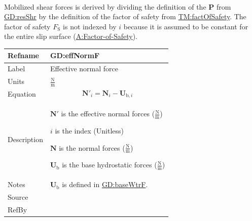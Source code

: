 \documentclass[12pt]{article}
\begin{document}
\paragraph{}
\label{GD:mobShrDeriv}
Mobilized shear forces is derived by dividing the definition of the $\symbf{P}$ from \hyperref[GD:resShr]{GD:resShr} by the definition of the factor of safety from \hyperref[TM:factOfSafety]{TM:factOfSafety}. The factor of safety ${F_{\text{S}}}$ is not indexed by $i$ because it is assumed to be constant for the entire slip surface (\hyperref[assumpFOS]{A:Factor-of-Safety}).

\medskip
\noindent
\begin{minipage}{\textwidth}
\begin{tabular}{>{\raggedright}p{}>{\raggedright\arraybackslash}p{}}
\toprule \textbf{Refname} & \textbf{GD:effNormF}
\label{GD:effNormF}
\\ \midrule
Label & Effective normal force
        
\\ \midrule
Units & $\frac{\text{N}}{\text{m}}$
        
\\ \midrule
Equation & \begin{displaymath}
           {\symbf{N'}}_{i}={\symbf{N}}_{i}-{\symbf{U}_{\text{b},i}}
           \end{displaymath}
\\ \midrule
Description & \begin{symbDescription}
              \item{$\symbf{N'}$ is the effective normal forces ($\frac{\text{N}}{\text{m}}$)}
              \item{$i$ is the index (Unitless)}
              \item{$\symbf{N}$ is the normal forces ($\frac{\text{N}}{\text{m}}$)}
              \item{${\symbf{U}_{\text{b}}}$ is the base hydrostatic forces ($\frac{\text{N}}{\text{m}}$)}
              \end{symbDescription}
\\ \midrule
Notes & ${\symbf{U}_{\text{b}}}$ is defined in \hyperref[GD:baseWtrF]{GD:baseWtrF}.
        
\\ \midrule
Source & \cite{chen2005}
         
\\ \midrule
RefBy & 
\\ \bottomrule
\end{tabular}
\end{minipage}
\end{document}
